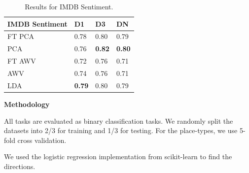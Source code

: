 \begin{table}[t]
	\centering
	\setlength{\tabcolsep}{10pt}
	\begin{tabularx}{\columnwidth}{llll}
		\toprule
		\textbf{IMDB Sentiment} & D1   & D3   & DN   \\
		\midrule
		FT PCA         & 0.78 & 0.80 & 0.79 \\
		PCA            & 0.76 & \textbf{0.82} & \textbf{0.80} \\
		FT AWV         & 0.72 & 0.76 & 0.71 \\
		AWV            & 0.74 & 0.76 & 0.71 \\
		LDA            & \textbf{0.79} & 0.80 & 0.79 \\
		\bottomrule
	\end{tabularx}
	\caption{Results for IMDB Sentiment. \label{tabSentiment}}
	
\end{table}

 




\noindent \textbf{Methodology} 

All tasks are evaluated as binary classification tasks. We randomly split the datasets into 2/3 for training and 1/3 for testing. For the place-types, we use 5-fold cross validation. 



We used the logistic regression implementation from scikit-learn to find the directions. 

